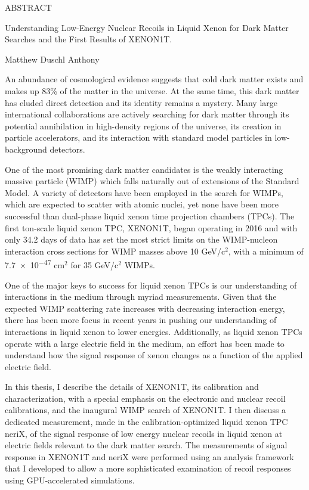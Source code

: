 
\pagestyle{empty} %
\begin{center}
  ABSTRACT

    Understanding Low-Energy Nuclear Recoils in Liquid Xenon for Dark Matter Searches and the First Results of XENON1T.

    Matthew Duschl Anthony
\end{center}

An abundance of cosmological evidence suggests that cold dark matter exists and makes up 83\% of the matter in the universe.  At the same time, this dark matter has eluded direct detection and its identity remains a mystery.  Many large international collaborations are actively searching for dark matter through its potential annihilation in high-density regions of the universe, its creation in particle accelerators, and its interaction with standard model particles in low-background detectors.

One of the most promising dark matter candidates is the weakly interacting massive particle (WIMP) which falls naturally out of extensions of the Standard Model.  A variety of detectors have been employed in the search for WIMPs, which are expected to scatter with atomic nuclei, yet none have been more successful than dual-phase liquid xenon time projection chambers (TPCs).  The first ton-scale liquid xenon TPC, XENON1T, began operating in 2016 and with only 34.2 days of data has set the most strict limits on the WIMP-nucleon interaction cross sections for WIMP masses above 10 GeV/$\textrm{c}^2$, with a minimum of \num{7.7e-47} $\textrm{cm}^2$ for 35 GeV/$\textrm{c}^2$ WIMPs.

One of the major keys to success for liquid xenon TPCs is our understanding of interactions in the medium through myriad measurements.  Given that the expected WIMP scattering rate increases with decreasing interaction energy, there has been more focus in recent years in pushing our understanding of interactions in liquid xenon to lower energies.  Additionally, as liquid xenon TPCs operate with a large electric field in the medium, an effort has been made to understand how the signal response of xenon changes as a function of the applied electric field.      
   
In this thesis, I describe the details of XENON1T, its calibration and characterization, with a special emphasis on the electronic and nuclear recoil calibrations, and the inaugural WIMP search of XENON1T.    I then discuss a dedicated measurement, made in the calibration-optimized liquid xenon TPC neriX, of the signal response of low energy nuclear recoils in liquid xenon at electric fields relevant to the dark matter search.  The measurements of signal response in XENON1T and neriX were performed using an analysis framework that I developed to allow a more sophisticated examination of recoil responses using GPU-accelerated simulations.


